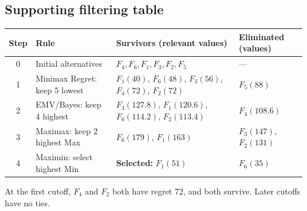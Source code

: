 \subsection*{Supporting filtering table}
\begin{center}\small
\begin{tabularx}{\textwidth}{@{}c >{\raggedright\arraybackslash}p{} >{\raggedright\arraybackslash}X >{\raggedright\arraybackslash}p{}@{}}
\toprule
Step & Rule & Survivors (relevant values) & Eliminated (values)\\\midrule
0 & Initial alternatives & $F_4,F_6,F_1,F_3,F_2,F_5$ & ---\\
1 & Minimax Regret: keep 5 lowest & $F_1(40)$, $F_6(48)$, $F_3(56)$, $F_4(72)$, $F_2(72)$ & $F_5(88)$\\
2 & EMV/Bayes: keep 4 highest & $F_3(127.8)$, $F_1(120.6)$, $F_6(114.2)$, $F_2(113.4)$ & $F_4(108.6)$\\
3 & Maximax: keep 2 highest Max & $F_6(179)$, $F_1(163)$ & $F_3(147)$, $F_2(131)$\\
4 & Maximin: select highest Min & \textbf{Selected:} $F_1(51)$ & $F_6(35)$\\
\bottomrule\end{tabularx}
\end{center}
At the first cutoff, $F_4$ and $F_2$ both have regret 72, and both survive. Later cutoffs have no ties.
\secInicio[sec:q4]

\label{sol:q4tree}
